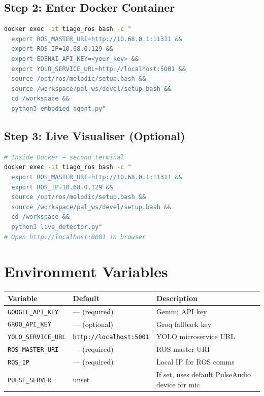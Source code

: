 \documentclass[12pt,a4paper]{report}
\begin{document}
\subsection{Step 2: Enter Docker Container}

\begin{lstlisting}[language=bash]
docker exec -it tiago_ros bash -c "
  export ROS_MASTER_URI=http://10.68.0.1:11311 &&
  export ROS_IP=10.68.0.129 &&
  export EDENAI_API_KEY=<your_key> &&
  export YOLO_SERVICE_URL=http://localhost:5001 &&
  source /opt/ros/melodic/setup.bash &&
  source /workspace/pal_ws/devel/setup.bash &&
  cd /workspace &&
  python3 embodied_agent.py"
\end{lstlisting}

\subsection{Step 3: Live Visualiser (Optional)}

\begin{lstlisting}[language=bash]
# Inside Docker — second terminal
docker exec -it tiago_ros bash -c "
  export ROS_MASTER_URI=http://10.68.0.1:11311 &&
  export ROS_IP=10.68.0.129 &&
  source /opt/ros/melodic/setup.bash &&
  source /workspace/pal_ws/devel/setup.bash &&
  cd /workspace &&
  python3 live_detector.py"
# Open http://localhost:8081 in browser
\end{lstlisting}

\section{Environment Variables}

\begin{center}
\begin{tabular}{lll}
\toprule
\textbf{Variable} & \textbf{Default} & \textbf{Description} \\
\midrule
\texttt{GOOGLE\_API\_KEY} & — (required) & Gemini API key \\
\texttt{GROQ\_API\_KEY}   & — (optional) & Groq fallback key \\
\texttt{YOLO\_SERVICE\_URL} & \texttt{http://localhost:5001} & YOLO microservice URL \\
\texttt{ROS\_MASTER\_URI} & — (required) & ROS master URI \\
\texttt{ROS\_IP}          & — (required) & Local IP for ROS comms \\
\texttt{PULSE\_SERVER}    & unset & If set, uses default PulseAudio device for mic \\
\bottomrule
\end{tabular}
\end{center}
\end{document}
